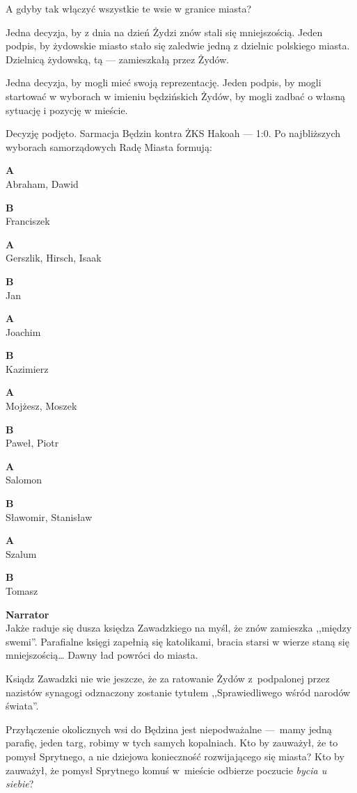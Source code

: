 \documentclass[11pt,a4paper,oneside]{article}
\begin{document}
A gdyby tak włączyć wszystkie te wsie w granice miasta?

Jedna decyzja, by z dnia na dzień Żydzi znów stali się mniejszością.
Jeden podpis, by żydowskie miasto stało się zaledwie jedną z dzielnic
polskiego miasta.  Dzielnicą żydowską, tą --- zamieszkałą przez Żydów. 

Jedna decyzja, by mogli mieć swoją reprezentację. Jeden podpis, by %
mogli startować w wyborach w imieniu będzińskich Żydów, by mogli
zadbać o własną sytuację i pozycję w mieście. 

Decyzję podjęto. Sarmacja Będzin kontra ŻKS Hakoah --- 1:0. Po
najbliższych wyborach samorządowych Radę Miasta formują:

\textbf{A}\\
Abraham, Dawid

\textbf{B}\\
Franciszek

\textbf{A}\\
Gerszlik, Hirsch, Isaak

\textbf{B}\\
Jan

\textbf{A}\\
Joachim

\textbf{B}\\
Kazimierz

\textbf{A}\\
Mojżesz,  Moszek

\textbf{B}\\
Paweł, Piotr

\textbf{A}\\
Salomon

\textbf{B}\\
Sławomir,  Stanisław

\textbf{A}\\
Szalum

\textbf{B}\\
Tomasz


\textbf{Narrator}\\
Jakże raduje się dusza księdza Zawadzkiego na myśl, że znów zamieszka
,,między swemi''.  Parafialne księgi zapełnią się katolikami, bracia
starsi w wierze staną się mniejszością\dots{} Dawny ład powróci do miasta.

Ksiądz Zawadzki nie wie jeszcze, że za ratowanie Żydów z~podpalonej
przez nazistów synagogi odznaczony zostanie tytułem ,,Sprawiedliwego
wśród narodów świata''.

Przyłączenie okolicznych wsi do Będzina jest niepodważalne \mbox{---}~mamy
jedną parafię, jeden targ, robimy w  tych samych kopalniach. Kto by
zauważył, że to pomysł Sprytnego, a nie dziejowa konieczność
rozwijającego się miasta?  Kto by zauważył, że pomysł Sprytnego komuś
w~mieście odbierze poczucie \emph{bycia u siebie}?
\end{document}
